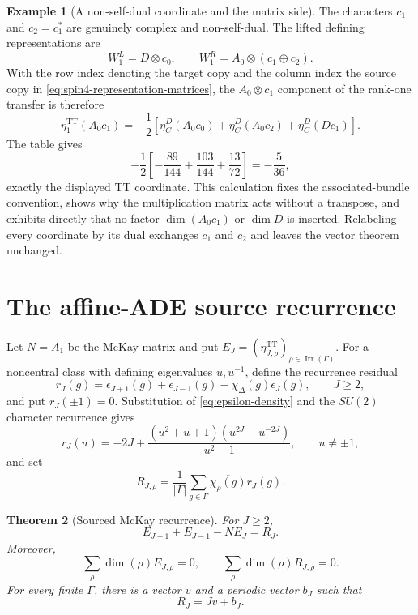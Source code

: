 \documentclass[11pt]{article}
\newtheorem{theorem}{Theorem}[section]
\theoremstyle{definition}
\newtheorem{example}[theorem]{Example}
\newcommand{\TT}{\mathrm{TT}}
\newcommand{\Irr}{\operatorname{Irr}}
\begin{document}
\begin{example}[A non-self-dual coordinate and the matrix side]
\label{ex:nonselfdual-coordinate}
The characters $c_1$ and $c_2=c_1^*$ are genuinely complex and
non-self-dual.  The lifted defining representations are
\[
 W_1^L=D\otimes c_0,\qquad
 W_1^R=A_0\otimes(c_1\oplus c_2).
\]
With the row index denoting the target copy and the column index the source
copy in \eqref{eq:spin4-representation-matrices}, the
$A_0\otimes c_1$ component of the rank-one transfer is therefore
\[
 \eta^{\TT}_1(A_0c_1)
 =-\frac12\left[
 \eta^D_C(A_0c_0)+\eta^D_C(A_0c_2)+\eta^D_C(Dc_1)\right].
\]
The table gives
\[
 -\frac12\left[-\frac{89}{144}
 +\frac{103}{144}+\frac{13}{72}\right]
 =-\frac5{36},
\]
exactly the displayed TT coordinate.  This calculation fixes the
associated-bundle convention, shows why the multiplication matrix acts
without a transpose, and exhibits directly that no factor
$\dim(A_0c_1)$ or $\dim D$ is inserted.  Relabeling every coordinate by its
dual exchanges $c_1$ and $c_2$ and leaves the vector theorem unchanged.
\end{example}

\section{The affine-ADE source recurrence}
\label{sec:mckay}

Let $N=A_1$ be the McKay matrix and put
$E_J=(\eta^{\TT}_{J,\rho})_{\rho\in\Irr(\Gamma)}$.  For a noncentral class
with defining eigenvalues $u,u^{-1}$, define the recurrence residual
\begin{equation}
 r_J(g)=\epsilon_{J+1}(g)+\epsilon_{J-1}(g)
 -\chi_\Delta(g)\epsilon_J(g),
 \qquad J\geq2,
 \label{eq:source-residual-definition}
\end{equation}
and put $r_J(\pm1)=0$.  Substitution of
\eqref{eq:epsilon-density} and the $SU(2)$ character recurrence gives
\begin{equation}
 r_J(u)=-2J+
 \frac{(u^2+u+1)(u^{2J}-u^{-2J})}{u^2-1},
 \qquad u\neq\pm1,
 \label{eq:source-density}
\end{equation}
and set
\begin{equation}
 R_{J,\rho}=\frac1{|\Gamma|}\sum_{g\in\Gamma}
 \overline{\chi_\rho(g)}r_J(g).
 \label{eq:source-vector}
\end{equation}

\begin{theorem}[Sourced McKay recurrence]
\label{thm:mckay-source}
For $J\geq2$,
\begin{equation}
 \boxed{E_{J+1}+E_{J-1}-NE_J=R_J.}
 \label{eq:mckay-source}
\end{equation}
Moreover,
\begin{equation}
 \sum_{\rho}\dim(\rho)E_{J,\rho}=0,
 \qquad
 \sum_{\rho}\dim(\rho)R_{J,\rho}=0.
 \label{eq:regular-completeness}
\end{equation}
For every finite $\Gamma$, there is a vector $v$ and a periodic vector
$b_J$ such that
\begin{equation}
 R_J=Jv+b_J.
 \label{eq:linear-periodic}
\end{equation}
\end{theorem}
\end{document}

